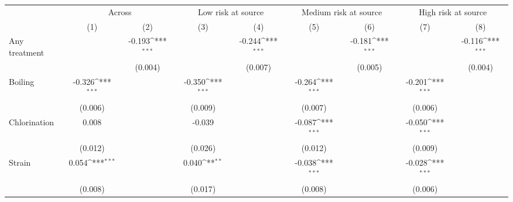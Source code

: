{
\def\sym#1{\ifmmode^{#1}\else\(^{#1}\)\fi}
\begin{tabular}{l*{8}{c}}
\hline\hline
                    &\multicolumn{2}{c}{Across}                 &\multicolumn{2}{c}{Low risk at source}     &\multicolumn{2}{c}{Medium risk at source}  &\multicolumn{2}{c}{High risk at source}    \\\cmidrule(lr){2-3}\cmidrule(lr){4-5}\cmidrule(lr){6-7}\cmidrule(lr){8-9}
                    &\multicolumn{1}{c}{(1)}         &\multicolumn{1}{c}{(2)}         &\multicolumn{1}{c}{(3)}         &\multicolumn{1}{c}{(4)}         &\multicolumn{1}{c}{(5)}         &\multicolumn{1}{c}{(6)}         &\multicolumn{1}{c}{(7)}         &\multicolumn{1}{c}{(8)}         \\
\hline
Any treatment &                     &      -0.193\sym{***}&                     &      -0.244\sym{***}&                     &      -0.181\sym{***}&                     &      -0.116\sym{***}\\
                    &                     &     (0.004)         &                     &     (0.007)         &                     &     (0.005)         &                     &     (0.004)         \\
Boiling             &      -0.326\sym{***}&                     &      -0.350\sym{***}&                     &      -0.264\sym{***}&                     &      -0.201\sym{***}&                     \\
                    &     (0.006)         &                     &     (0.009)         &                     &     (0.007)         &                     &     (0.006)         &                     \\
Chlorination        &       0.008         &                     &      -0.039         &                     &      -0.087\sym{***}&                     &      -0.050\sym{***}&                     \\
                    &     (0.012)         &                     &     (0.026)         &                     &     (0.012)         &                     &     (0.009)         &                     \\
Strain              &       0.054\sym{***}&                     &       0.040\sym{**} &                     &      -0.038\sym{***}&                     &      -0.028\sym{***}&                     \\
                    &     (0.008)         &                     &     (0.017)         &                     &     (0.008)         &                     &     (0.006)         &                     \\

\end{tabular}}
